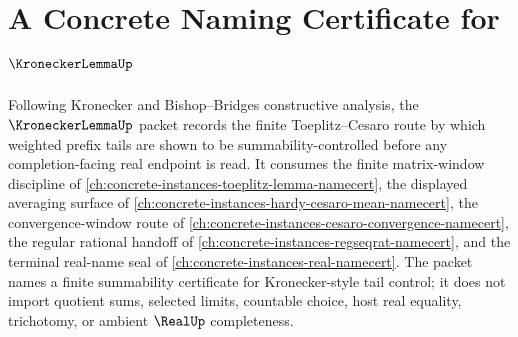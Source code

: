 \chapter{A Concrete Naming Certificate for $\KroneckerLemmaUp$}
\label{ch:concrete-instances-kronecker-lemma-namecert}

Following Kronecker and Bishop--Bridges constructive analysis, the $\KroneckerLemmaUp$ packet records the finite Toeplitz--Cesaro route by which weighted prefix tails are shown to be summability-controlled before any completion-facing real endpoint is read. It consumes the finite matrix-window discipline of \autoref{ch:concrete-instances-toeplitz-lemma-namecert}, the displayed averaging surface of \autoref{ch:concrete-instances-hardy-cesaro-mean-namecert}, the convergence-window route of \autoref{ch:concrete-instances-cesaro-convergence-namecert}, the regular rational handoff of \autoref{ch:concrete-instances-regseqrat-namecert}, and the terminal real-name seal of \autoref{ch:concrete-instances-real-namecert}. The packet names a finite summability certificate for Kronecker-style tail control; it does not import quotient sums, selected limits, countable choice, host real equality, trichotomy, or ambient $\RealUp$ completeness.

